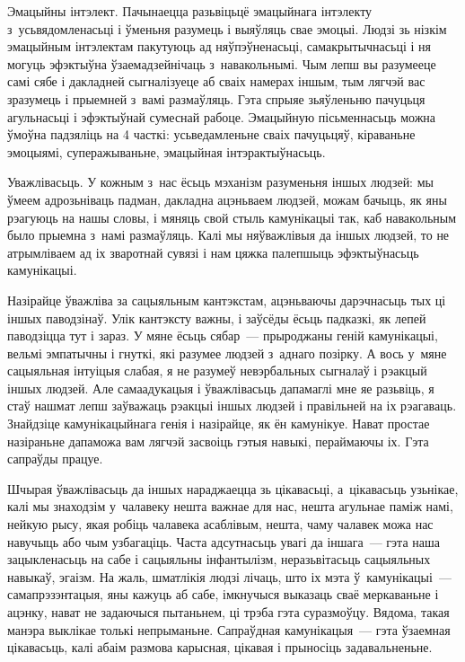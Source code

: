 Эмацыйны інтэлект. Пачынаецца разьвіцьцё эмацыйнага інтэлекту з~усьвядомленасьці і ўменьня разумець і выяўляць свае эмоцыі. Людзі зь нізкім эмацыйным інтэлектам пакутуюць ад няўпэўненасьці, самакрытычнасьці і ня могуць эфэктыўна ўзаемадзейнічаць з~навакольнымі. Чым лепш вы разумееце самі сябе і дакладней сыгналізуеце аб сваіх намерах іншым, тым лягчэй вас зразумець і прыемней з~вамі размаўляць. Гэта спрыяе зьяўленьню пачуцьця агульнасьці і эфэктыўнай сумеснай рабоце. Эмацыйную пісьменнасьць можна ўмоўна падзяліць на 4 часткі: усьведамленьне сваіх пачуцьцяў, кіраваньне эмоцыямі, суперажываньне, эмацыйная інтэрактыўнасьць.

Уважлівасьць. У кожным з~нас ёсьць мэханізм разуменьня іншых людзей: мы ўмеем адрозьніваць падман, дакладна ацэньваем людзей, можам бачыць, як яны рэагуюць на нашы словы, і мяняць свой стыль камунікацыі так, каб навакольным было прыемна з~намі размаўляць. Калі мы няўважлівыя да іншых людзей, то не атрымліваем ад іх зваротнай сувязі і нам цяжка палепшыць эфэктыўнасьць камунікацыі. 

Назірайце ўважліва за сацыяльным кантэкстам, ацэньваючы дарэчнасьць тых ці іншых паводзінаў. Улік кантэксту важны, і заўсёды ёсьць падказкі, як лепей паводзіцца тут і зараз. У мяне ёсьць сябар~--- прыроджаны геній камунікацыі, вельмі эмпатычны і гнуткі, які разумее людзей з~аднаго позірку. А вось у~мяне сацыяльная інтуіцыя слабая, я не разумеў невэрбальных сыгналаў і рэакцый іншых людзей. Але самаадукацыя і ўважлівасьць дапамаглі мне яе разьвіць, я стаў нашмат лепш заўважаць рэакцыі іншых людзей і правільней на іх рэагаваць. Знайдзіце камунікацыйнага генія і назірайце, як ён камунікуе. Нават простае назіраньне дапаможа вам лягчэй засвоіць гэтыя навыкі, пераймаючы іх. Гэта сапраўды працуе.

Шчырая ўважлівасьць да іншых нараджаецца зь цікавасьці, а~цікавасьць узьнікае, калі мы знаходзім у~чалавеку нешта важнае для нас, нешта агульнае паміж намі, нейкую рысу, якая робіць чалавека асаблівым, нешта, чаму чалавек можа нас навучыць або чым узбагаціць. Часта адсутнасьць увагі да іншага~--- гэта наша зацыкленасьць на сабе і сацыяльны інфантылізм, неразьвітасьць сацыяльных навыкаў, эгаізм. На жаль, шматлікія людзі лічаць, што іх мэта ў~камунікацыі~--- самапрэзэнтацыя, яны кажуць аб сабе, імкнучыся выказаць сваё меркаваньне і ацэнку, нават не задаючыся пытаньнем, ці трэба гэта суразмоўцу. Вядома, такая манэра выклікае толькі непрыманьне. Сапраўдная камунікацыя~--- гэта ўзаемная цікавасьць, калі абаім размова карысная, цікавая і прыносіць задавальненьне.

